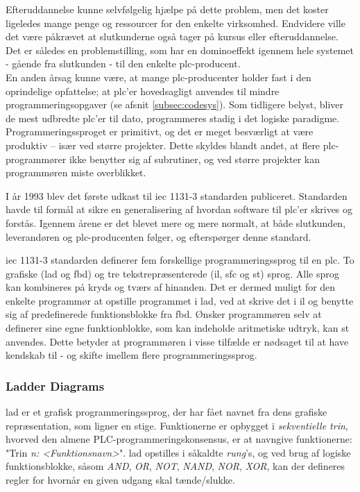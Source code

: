 Efteruddannelse kunne selvfølgelig hjælpe på dette problem, men det koster ligeledes mange penge og ressourcer for den enkelte virksomhed. Endvidere ville det være påkrævet at slutkunderne også tager på kursus eller efteruddannelse. 
Det er således en problemstilling, som har en dominoeffekt igennem hele systemet - gående fra slutkunden - til den enkelte \gls{plc}-producent. \\

\noindent En anden årsag kunne være, at mange \gls{plc}-producenter holder fast i den oprindelige opfattelse; at \gls{plc}'er hovedsagligt anvendes til mindre programmeringsopgaver (se afsnit \ref{subsec:codesys}). Som tidligere belyst, bliver de mest udbredte \gls{plc}'er til dato, programmeres stadig i det logiske paradigme. Programmeringssproget er primitivt, og det er meget besværligt at være produktiv – især ved større projekter. Dette skyldes blandt andet, at flere \gls{plc}-programmører ikke benytter sig af subrutiner, og ved større projekter kan programmøren miste overblikket. 

\noindent I år 1993 blev det første udkast til \gls{iec} 1131-3 standarden publiceret\cite{iecStandard}. Standarden havde til formål at sikre en generalisering af hvordan software til \gls{plc}'er skrives og forstås. Igennem årene er det blevet mere og mere normalt, at både slutkunden, leverandøren og \gls{plc}-producenten følger, og efterspørger denne standard. 

\gls{iec} 1131-3 standarden definerer fem forskellige programmeringssprog til en \gls{plc}. To grafiske (\gls{lad} og \gls{fbd}) og tre tekstrepræsenterede (\gls{il}, \gls{sfc} og \gls{st}) sprog. Alle sprog kan kombineres på kryds og tværs af hinanden. Det er dermed muligt for den enkelte programmør at opstille programmet i \gls{lad}, ved at skrive det i \gls{il} og benytte sig af predefinerede funktionsblokke fra \gls{fbd}. Ønsker programmøren selv at definerer sine egne funktionblokke, som kan indeholde aritmetiske udtryk, kan \gls{st} anvendes. Dette betyder at programmøren i visse tilfælde er nødsaget til at have kendskab til - og skifte imellem flere programmeringssprog. 

\subsubsection{Ladder Diagrams}
\gls{lad} er et grafisk programmeringssprog, der har fået navnet fra dens grafiske repræsentation, som ligner en stige. Funktionerne er opbygget i \textit{sekventielle trin}, hvorved den almene PLC-programmeringskonsensus, er at navngive funktionerne: "Trin \textit{n: <Funktionsnavn>}". 
\gls{lad} opstilles i såkaldte \textit{rung}'s, og ved brug af logiske funktionsblokke, såsom \textit{AND}, \textit{OR}, \textit{NOT}, \textit{NAND}, \textit{NOR}, \textit{XOR}, kan der defineres regler for hvornår en given udgang skal tænde/slukke. 

